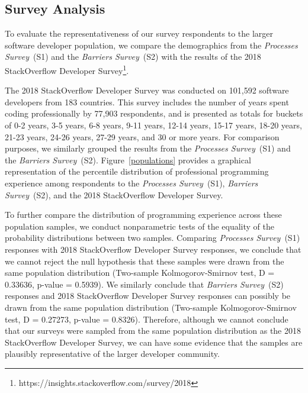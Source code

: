 \subsection{Survey Analysis}\label{analysis}
To evaluate the representativeness of our survey respondents to the larger software developer population, we compare the demographics from the \textit{Processes Survey}~(S1) and the \textit{Barriers Survey}~(S2) with the results of the 2018 StackOverflow Developer Survey\footnote{https://insights.stackoverflow.com/survey/2018}.

The 2018 StackOverflow Developer Survey was conducted on 101,592 software developers from 183 countries.
This survey includes the number of years spent coding professionally by 77,903 respondents, and is presented as totals for buckets of 0-2 years, 3-5 years, 6-8 years, 9-11 years, 12-14 years, 15-17 years, 18-20 years, 21-23 years, 24-26 years, 27-29 years, and 30 or more years.
For comparison purposes, we similarly grouped the results from the \textit{Processes Survey}~(S1) and the \textit{Barriers Survey}~(S2).
Figure~\ref{populations} provides a graphical representation of the percentile distribution of professional programming experience among respondents to the \textit{Processes Survey}~(S1), \textit{Barriers Survey}~(S2), and the 2018 StackOverflow Developer Survey.

To further compare the distribution of programming experience across these population samples, we conduct nonparametric tests of the equality of the probability distributions between two samples.
Comparing \textit{Processes Survey}~(S1) responses with 2018 StackOverflow Developer Survey responses, we conclude that we cannot reject the null hypothesis that these samples were drawn from the same population distribution (Two-sample Kolmogorov-Smirnov test, D = 0.33636, p-value = 0.5939).
We similarly conclude that \textit{Barriers Survey}~(S2) responses and 2018 StackOverflow Developer Survey responses can possibly be drawn from the same population distribution (Two-sample Kolmogorov-Smirnov test, D = 0.27273, p-value = 0.8326).
Therefore, although we cannot conclude that our surveys were sampled from the same population distribution as the 2018 StackOverflow Developer Survey, we can have some evidence that the samples are plausibly representative of the larger developer community. 

